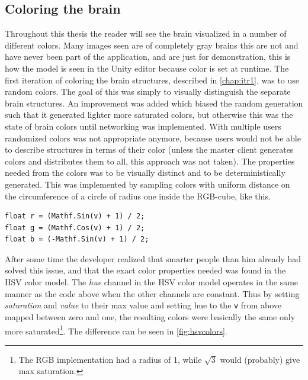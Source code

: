 \subsection{Coloring the brain}\label{chap:braincolor}

Throughout this thesis the reader will see the brain visualized in a number of different colors. Many images seen are of completely gray brains this are not and have never been part of the application, and are just for demonstration, this is how the model is seen in the Unity editor because color is set at runtime. The first iteration of coloring the brain structures, described in \autoref{chap:itr1}, was to use random colors. The goal of this was simply to visually distinguish the separate brain structures. An improvement was added which biased the random generation such that it generated lighter more saturated colors, but otherwise this was the state of brain colors until networking was implemented. With multiple users randomized colors was not appropriate anymore, because users would not be able to describe structures in terms of their color (unless the master client generates colors and distributes them to all, this approach was not taken). The properties needed from the colors was to be visually distinct and to be deterministically generated. This was implemented by sampling colors with uniform distance on the circumference of a circle of radius one inside the RGB-cube, like this. 
\begin{lstlisting}[caption={With \texttt{v} ranging from 0 to 2$\pi$.}]
float r = (Mathf.Sin(v) + 1) / 2;
float g = (Mathf.Cos(v) + 1) / 2;
float b = (-Mathf.Sin(v) + 1) / 2;
\end{lstlisting}
After some time the developer realized that smarter people than him already had solved this issue, and that the exact color properties needed was found in the HSV color model. The \textit{hue} channel in the HSV color model operates in the same manner as the code above when the other channels are constant. Thus by setting \textit{saturation} and \textit{value} to their max value and setting hue to the \texttt{v} from above mapped between zero and one, the resulting colors were basically the same only more saturated\footnote{The RGB implementation had a radius of 1, while $\sqrt{3}$ would (probably) give max saturation.}. The difference can be seen in \autoref{fig:hsvcolors}.

